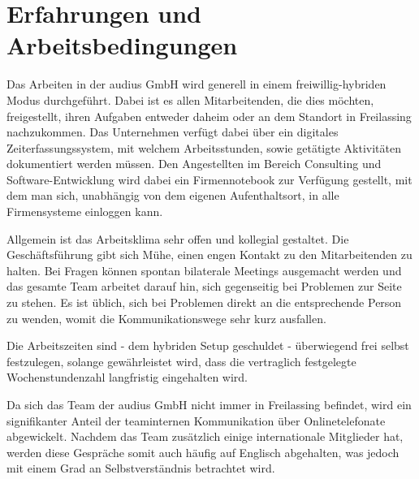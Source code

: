 
\section{Erfahrungen und Arbeitsbedingungen}
\label{sec:arbeitsbedingungen}

Das Arbeiten in der audius GmbH wird generell in einem freiwillig-hybriden Modus durchgeführt. Dabei ist es allen Mitarbeitenden, die dies möchten, freigestellt, ihren Aufgaben entweder daheim oder an dem Standort in Freilassing nachzukommen. Das Unternehmen verfügt dabei über ein digitales Zeiterfassungssystem, mit welchem Arbeitsstunden, sowie getätigte Aktivitäten dokumentiert werden müssen. Den Angestellten im Bereich Consulting und Software-Entwicklung wird dabei ein Firmennotebook zur Verfügung gestellt, mit dem man sich, unabhängig von dem eigenen Aufenthaltsort, in alle Firmensysteme einloggen kann.

Allgemein ist das Arbeitsklima sehr offen und kollegial gestaltet. Die Geschäftsführung gibt sich Mühe, einen engen Kontakt zu den Mitarbeitenden zu halten. Bei Fragen können spontan bilaterale Meetings ausgemacht werden und das gesamte Team arbeitet darauf hin, sich gegenseitig bei Problemen zur Seite zu stehen. Es ist üblich, sich bei Problemen direkt an die entsprechende Person zu wenden, womit die Kommunikationswege sehr kurz ausfallen.

Die Arbeitszeiten sind - dem hybriden Setup geschuldet - überwiegend frei selbst festzulegen, solange gewährleistet wird, dass die vertraglich festgelegte Wochenstundenzahl langfristig eingehalten wird. 

Da sich das Team der audius GmbH nicht immer in Freilassing befindet, wird ein signifikanter Anteil der teaminternen Kommunikation über Onlinetelefonate abgewickelt. Nachdem das Team zusätzlich einige internationale Mitglieder hat, werden diese Gespräche somit auch häufig auf Englisch abgehalten, was jedoch mit einem Grad an Selbstverständnis betrachtet wird.
